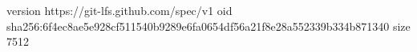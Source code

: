 version https://git-lfs.github.com/spec/v1
oid sha256:6f4ec8ae5e928cf511540b9289e6fa0654df56a21f8e28a552339b334b871340
size 7512
